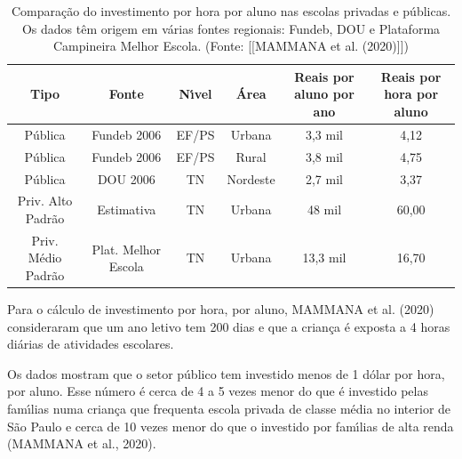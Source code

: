\documentclass[
12pt,		%
openright,	%
twoside,  %
a4paper,			%
chapter=TITLE,		%
english,			%
french,				%
spanish,			%
brazil				%
]{USPSC-classe/USPSC}
\begin{document}
\begin{table}[htb]
\tiny
\caption{\label{02a61f21bf9049ea550d07c2199237e202a09ecd}Compara\c{c}\~ao do investimento por hora por aluno nas escolas privadas e p\'ublicas. Os dados t\^em origem em v\'arias fontes regionais: Fundeb, DOU e Plataforma Campineira Melhor Escola. (Fonte:  [[MAMMANA et al. (2020)]])}

\centering
\begin{tabular}{|c|c|c|c|c|c|}
\hline
Tipo  &  Fonte  &  N\'{\i}vel  &  \'Area  &  Reais por aluno por ano  &  Reais por hora por aluno \\
\hline
P\'ublica  &  Fundeb 2006  &  EF/PS  &  Urbana  &  3,3 mil  &  4,12 \\
P\'ublica  &  Fundeb 2006  &  EF/PS  &  Rural  &  3,8 mil  &  4,75 \\
P\'ublica  &  DOU 2006  &  TN  &  Nordeste  &  2,7 mil  &  3,37 \\
Priv. Alto Padr\~ao  &  Estimativa  &  TN  &  Urbana  &  48 mil  &  60,00 \\
Priv. M\'edio Padr\~ao  &  Plat. Melhor Escola  &  TN  &  Urbana  &  13,3 mil  &  16,70 \\
\hline
\end{tabular}
\end{table}


Para o c\'alculo de investimento por hora, por aluno,  MAMMANA et al. (2020) consideraram que um ano letivo tem 200 dias e que a crian\c{c}a \'e exposta a 4 horas di\'arias de atividades escolares.




Os dados mostram que o setor p\'ublico tem investido menos de 1 d\'olar por hora, por aluno. Esse n\'umero \'e cerca de 4 a 5 vezes menor do que \'e investido pelas fam\'{\i}lias numa crian\c{c}a que frequenta escola privada de classe m\'edia no interior de S\~ao Paulo e cerca de 10 vezes menor do que o investido por fam\'{\i}lias de alta renda  (MAMMANA et al., 2020).





\noindent\begin{center}\mbox{\centering{}}\end{center}
\end{document}
